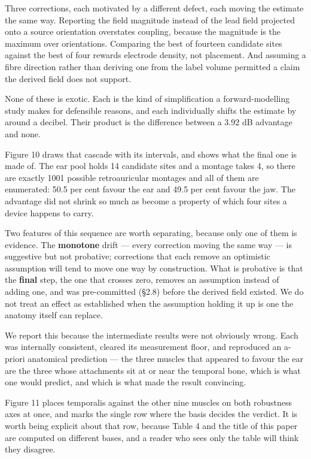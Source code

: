\documentclass[
  11pt,
  letterpaper,
]{article}
\newcounter{none} %
\begin{document}
Three corrections, each motivated by a different defect, each moving the
estimate the same way. Reporting the field magnitude instead of the lead field
projected onto a source orientation overstates coupling, because the magnitude
is the maximum over orientations. Comparing the best of fourteen candidate sites
against the best of four rewards electrode density, not placement. And assuming
a fibre direction rather than deriving one from the label volume permitted a
claim the derived field does not support.

None of these is exotic. Each is the kind of simplification a forward-modelling
study makes for defensible reasons, and each individually shifts the estimate by
around a decibel. Their product is the difference between a 3.92 dB advantage and
none.

Figure 10 draws that cascade with its intervals, and shows what the final one is
made of. The ear pool holds 14 candidate sites and a montage takes 4, so there
are exactly 1001 possible retroauricular montages and all of them are
enumerated: 50.5 per cent favour the ear and 49.5 per cent favour the jaw. The
advantage did not shrink so much as become a property of which four sites a
device happens to carry.

Two features of this sequence are worth separating, because only one of them is
evidence. The \textbf{monotone} drift --- every correction moving the same way --- is
suggestive but not probative; corrections that each remove an optimistic
assumption will tend to move one way by construction. What is probative is that
the \textbf{final} step, the one that crosses zero, removes an assumption instead of
adding one, and was pre-committed (\S{}2.8) before the derived field existed. We do
not treat an effect as established when the assumption holding it up is one the
anatomy itself can replace.

We report this because the intermediate results were not obviously wrong. Each
was internally consistent, cleared its measurement floor, and reproduced an
a-priori anatomical prediction --- the three muscles that appeared to favour the
ear are the three whose attachments sit at or near the temporal bone, which is
what one would predict, and which is what made the result convincing.

Figure 11 places temporalis against the other nine muscles on both robustness
axes at once, and marks the single row where the basis decides the verdict. It
is worth being explicit about that row, because Table 4 and the title of this
paper are computed on different bases, and a reader who sees only the table will
think they disagree.
\end{document}
